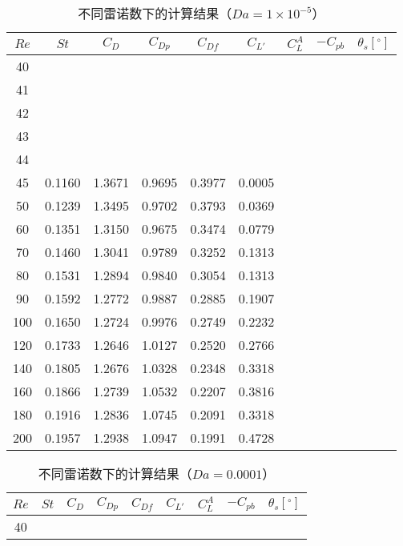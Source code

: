 \begin{table}[h]
	\caption{不同雷诺数下的计算结果（$Da=1\times 10^{-5}$）}\label{tab: results-1e-5}
	\vspace{.5em}\centering\wuhao
	\begin{tabular}{*{9}{c}}
		\toprule[1.5pt]
		$Re$ & $St$ & $C_D$ & $C_{Dp}$ & $C_{Df}$ & $C_{L'}$ & $C_L^A$ & $-C_{pb}$ & $\theta_s[^\circ]$ \\
		\midrule[1pt]
		 40 &  \\
		 41 &  \\
		 42 &  \\
		 43 &  \\
		 44 &  \\
		 45 & 0.1160 & 1.3671 & 0.9695 & 0.3977 & 0.0005  	 \\
		 50 & 0.1239 & 1.3495 & 0.9702 & 0.3793 & 0.0369 	 \\
		 60 & 0.1351 & 1.3150 & 0.9675 & 0.3474 & 0.0779 	 \\
		 70 & 0.1460 & 1.3041 & 0.9789 & 0.3252 & 0.1313 	 \\
		 80 & 0.1531 & 1.2894 &	0.9840 & 0.3054 & 0.1313  \\
		 90 & 0.1592 & 1.2772 &	0.9887 & 0.2885 & 0.1907 \\
		100 & 0.1650 & 1.2724 &	0.9976 & 0.2749 & 0.2232 \\
		120 & 0.1733 & 1.2646 &	1.0127 & 0.2520 & 0.2766 \\
		140 & 0.1805 & 1.2676 &	1.0328 & 0.2348 & 0.3318 \\
		160 & 0.1866 & 1.2739 &	1.0532 & 0.2207 & 0.3816 \\
		180 & 0.1916 & 1.2836 &	1.0745 & 0.2091 & 0.3318 \\
		200 & 0.1957 & 1.2938 &	1.0947 & 0.1991 & 0.4728 \\
		\bottomrule[1.5pt]
	\end{tabular}
\end{table}

\begin{table}[h]
	\caption{不同雷诺数下的计算结果（$Da=0.0001$）}\label{tab: results-1e-4}
	\vspace{.5em}\centering\wuhao
	\begin{tabular}{*{9}{c}}
		\toprule[1.5pt]
		$Re$ & $St$ & $C_D$ & $C_{Dp}$ & $C_{Df}$ & $C_{L'}$ & $C_L^A$ & $-C_{pb}$ & $\theta_s[^\circ]$ \\
		\midrule[1pt]
		 40 &  \\
		\bottomrule[1.5pt]
	\end{tabular}
\end{table}

